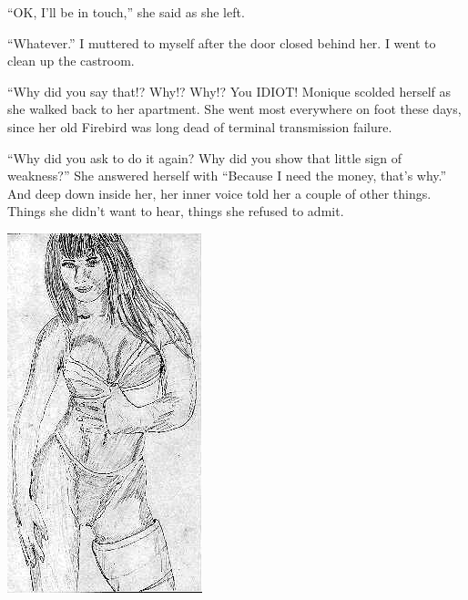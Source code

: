 ``OK, I'll be in touch,'' she said as she left.

``Whatever.'' I muttered to myself after the door closed behind her. I went to clean up the
castroom.

\begin{thought}
``Why did you say that!? Why!? Why!? You IDIOT! Monique scolded herself as she walked back
to her apartment. She went most everywhere on foot these days, since her old Firebird was long
dead of terminal transmission failure.

``Why did you ask to do it again? Why did you show that little sign of weakness?'' She
answered herself with ``Because I need the money, that's why.'' And deep down inside her, her
inner voice told her a couple of other things. Things she didn't want to hear, things she
refused to admit.
\end{thought}

\begin{center}
\includegraphics{images/kicks08.jpg}
\end{center}
